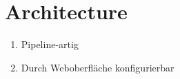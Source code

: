 
\section{Architecture}

\begin{enumerate}
\item Pipeline-artig
\item Durch Weboberfläche konfigurierbar
\end{enumerate}